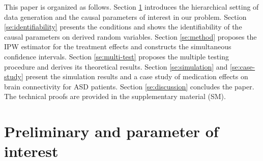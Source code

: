 \documentclass[12pt]{article}
\theoremstyle{definition}
\begin{document}
This paper is organized as follows. Section \ref{se:background} introduces the hierarchical setting of data generation and the causal parameters of interest in our problem. 
Section \ref{se:identifiability} presents the conditions and shows the identifiability of the causal parameters on derived random variables.
Section \ref{se:method} proposes the IPW estimator for the treatment effects 
and constructs the simultaneous confidence intervals. 
Section \ref{se:multi-test} proposes the multiple testing procedure 
and derives its theoretical results. 
Section \ref{se:simulation} and \ref{se:case-study} present the simulation results and a case study of medication effects on brain connectivity for ASD patients. 
Section \ref{se:discussion} concludes the paper.
The technical proofs are provided in the supplementary material (SM).


\setcounter{equation}{0}
\section{Preliminary and parameter of interest}\label{se:background}
\end{document}
